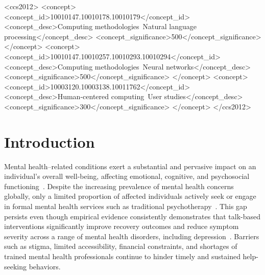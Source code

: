 \documentclass[sigconf]{acmart}
\begin{document}
\begin{CCSXML}
<ccs2012>
<concept>
<concept_id>10010147.10010178.10010179</concept_id>
<concept_desc>Computing methodologies~Natural language processing</concept_desc>
<concept_significance>500</concept_significance>
</concept>
<concept>
<concept_id>10010147.10010257.10010293.10010294</concept_id>
<concept_desc>Computing methodologies~Neural networks</concept_desc>
<concept_significance>500</concept_significance>
</concept>
<concept>
<concept_id>10003120.10003138.10011762</concept_id>
<concept_desc>Human-centered computing~User studies</concept_desc>
<concept_significance>300</concept_significance>
</concept>
</ccs2012>
\end{CCSXML}



\maketitle


\section{Introduction}

Mental health--related conditions exert a substantial and pervasive impact on an individual's overall well-being, affecting emotional, cognitive, and psychosocial functioning~\cite{wren-lewis_mental_2021}. Despite the increasing prevalence of mental health concerns globally, only a limited proportion of affected individuals actively seek or engage in formal mental health services such as traditional psychotherapy~\cite{zhao_research_2025}. This gap persists even though empirical evidence consistently demonstrates that talk-based interventions significantly improve recovery outcomes and reduce symptom severity across a range of mental health disorders, including depression~\cite{c_ncheke_efficacy_2024}. Barriers such as stigma, limited accessibility, financial constraints, and shortages of trained mental health professionals continue to hinder timely and sustained help-seeking behaviors.
\end{document}
